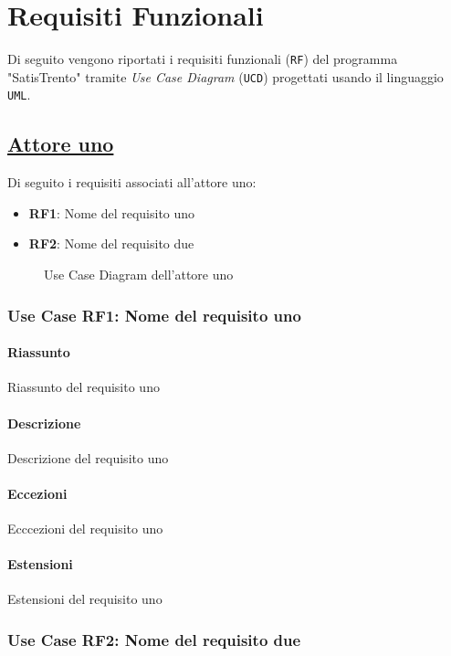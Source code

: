 \chapter{Requisiti Funzionali}
\label{ch:requisitiFunzionali}

Di seguito vengono riportati i requisiti funzionali (\texttt{RF}) del programma "SatisTrento" tramite \textit{Use Case Diagram} (\texttt{UCD}) progettati usando il linguaggio \texttt{UML}.

\section{\underline{Attore uno}}
    Di seguito i requisiti associati all'attore uno:
    \begin{itemize}
        \item \textbf{RF1}: Nome del requisito uno
        \item \textbf{RF2}: Nome del requisito due
    \end{itemize}
    \begin{figure}[H]
        \centering
        \caption{Use Case Diagram dell'attore uno}
    \end{figure}
    \subsection{Use Case {RF1}: Nome del requisito uno}
        \subsubsection{Riassunto}
            Riassunto del requisito uno
        \subsubsection{Descrizione}
            Descrizione del requisito uno
        \subsubsection{Eccezioni}
            Ecccezioni del requisito uno
        \subsubsection{Estensioni}
            Estensioni del requisito uno
    \subsection{Use Case {RF2}: Nome del requisito due}
        
